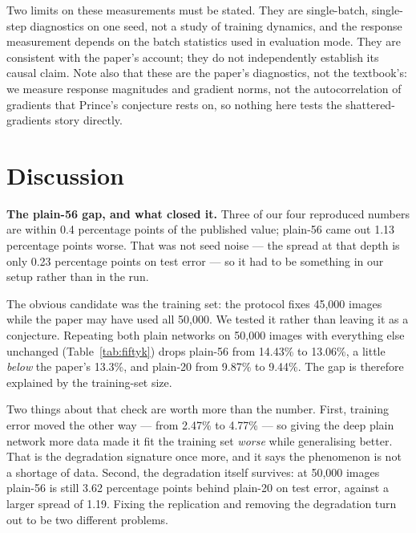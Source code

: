 \documentclass[11pt,a4paper]{article}
\newcommand{\pp}{percentage points}
\begin{document}
Two limits on these measurements must be stated. They are single-batch, single-
step diagnostics on one seed, not a study of training dynamics, and the
response measurement depends on the batch statistics used in evaluation mode.
They are consistent with the paper's account; they do not independently establish
its causal claim. Note also that these are the paper's diagnostics, not the
textbook's: we measure response magnitudes and gradient norms, not the
autocorrelation of gradients that Prince's conjecture rests on, so nothing here
tests the shattered-gradients story directly.

\section{Discussion}
\label{sec:discussion}

\textbf{The plain-56 gap, and what closed it.} Three of our four reproduced
numbers are within 0.4 \pp{} of the published value; plain-56 came out 1.13
\pp{} worse. That was not seed noise --- the spread at that depth is only 0.23
\pp{} on test error --- so it had to be something in our setup rather than in
the run.

The obvious candidate was the training set: the protocol fixes 45{,}000 images
while the paper may have used all 50{,}000. We tested it rather than leaving it
as a conjecture. Repeating both plain networks on 50{,}000 images with
everything else unchanged (Table~\ref{tab:fiftyk}) drops plain-56 from 14.43\%
to 13.06\%, a little \emph{below} the paper's 13.3\%, and plain-20 from 9.87\%
to 9.44\%. The gap is therefore explained by the training-set size.

Two things about that check are worth more than the number. First, training
error moved the other way --- from 2.47\% to 4.77\% --- so giving the deep plain
network more data made it fit the training set \emph{worse} while generalising
better. That is the degradation signature once more, and it says the phenomenon
is not a shortage of data. Second, the degradation itself survives: at 50{,}000
images plain-56 is still 3.62 \pp{} behind plain-20 on test error, against a
larger spread of 1.19. Fixing the replication and removing the degradation turn
out to be two different problems.
\end{document}
